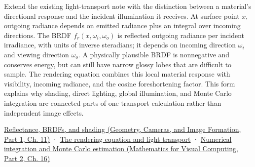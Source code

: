 Extend the existing light-transport note with the distinction between a material's directional response and the incident illumination it receives. At surface point \(x\), outgoing radiance depends on emitted radiance plus an integral over incoming directions. The BRDF \(f_r(x,\omega_i,\omega_o)\) is reflected outgoing radiance per incident irradiance, with units of inverse steradians; it depends on incoming direction \(\omega_i\) and viewing direction \(\omega_o\). A physically plausible BRDF is nonnegative and conserves energy, but can still have narrow glossy lobes that are difficult to sample. The rendering equation combines this local material response with visibility, incoming radiance, and the cosine foreshortening factor. This form explains why shading, direct lighting, global illumination, and Monte Carlo integration are connected parts of one transport calculation rather than independent image effects.

\href{../03-Geometry-Cameras-and-Image-Formation-P01/main.pdf\#03-visual-computing-i-ch004-reflectance-brdfs-and-shading}{Reflectance, BRDFs, and shading (Geometry, Cameras, and Image Formation, Part 1, Ch. 11)} · \hyperref[03-visual-computing-i-ch007-the-rendering-equation-and-light-transport]{The rendering equation and light transport} · \href{../02-Mathematics-for-Visual-Computing-P02/main.pdf\#03-visual-computing-i-ch012-numerical-integration-and-monte-carlo-estimation}{Numerical integration and Monte Carlo estimation (Mathematics for Visual Computing, Part 2, Ch. 16)}
